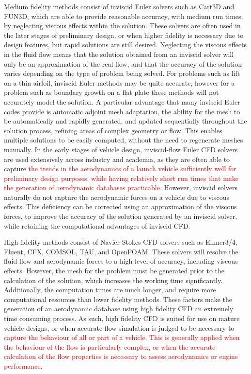 Medium fidelity methods consist of inviscid Euler solvers such as Cart3D\cite{CART3D} and FUN3D\cite{fun3d}, which are able to provide reasonable accuracy, with medium run times, by neglecting viscous effects within the solution. These solvers are often used in the later stages of preliminary design, or when higher fidelity is necessary due to design features, but rapid solutions are still desired.  Neglecting the viscous effects in the fluid flow means that the solution obtained from an inviscid solver will only be an approximation of the real flow, and that the accuracy of the solution varies depending on the type of problem being solved. For problems such as lift on a thin airfoil, inviscid Euler methods may be quite accurate, however for a problem such as boundary growth on a flat plate these methods will not accurately model the solution\cite{NASAEuler}. A particular advantage that many inviscid Euler codes provide is automatic adjoint mesh adaptation, the ability for the mesh to be automatically and rapidly generated, and updated sequentially throughout the solution process, refining areas of complex geometry or flow. This enables multiple solutions to be easily computed, without the need to regenerate meshes manually. In the early stages of vehicle design, inviscid-flow Euler CFD solvers are used extensively across industry and academia\cite{Almosnino2016}, as they are often able to capture \textcolor{red}{the trends in the aerodynamics of a launch vehicle sufficiently well for preliminary design purposes, while having relatively short run times that make the generation of aerodynamic databases practicable.}
 However, inviscid solvers naturally do not capture the aerodynamic forces on a vehicle due to viscous effects. This deficiency can be corrected using an approximation of the viscous forces, to improve the accuracy of the solution generated by an inviscid solver, while retaining the computational advantages of inviscid CFD\cite{Ward2018}. 

High fidelity methods consist of Navier-Stokes CFD solvers such as Eilmer3/4\cite{Gollan2013b}, Fluent\cite{Ansys2014}, CFX\cite{CFX}, COMSOL\cite{comsol}, TAU\cite{Schwamborn2006}, and OpenFOAM\cite{openfoam}. These solvers will resolve the fluid flow and aerodynamic forces to a high level of accuracy, including viscous effects. However, the mesh for the problem must be generated prior to the calculation of the solution, which increases the working time significantly. Additionally, the computation times are much longer, and require more computational resources than lower fidelity methods. These factors make the generation of an aerodynamic database using high fidelity CFD an extremely time consuming process. As such, high fidelity CFD is suited for use on mature vehicle designs, or when accurate flow simulation is judged to be necessary to \textcolor{red}{capture the behaviour of all or part of a vehicle. This is generally applied when the behaviour of the flow is particularly complex, or when the accurate calculation of the flow properties is necessary to assess aerodynamics or engine performance.}




